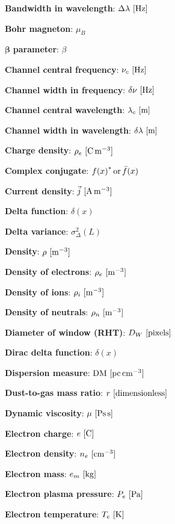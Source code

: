 \documentclass[a4paper,10pt]{article}
\begin{document}
{\noindent}\textbf{Bandwidth in wavelength}: $\Delta\lambda~[{\rm Hz}]$

{\noindent}\textbf{Bohr magneton}: $\mu_B$

{\noindent}$\boldsymbol{\beta}$ \textbf{parameter}: $\beta$

{\noindent}\textbf{Channel central frequency}: $\nu_c~[{\rm Hz}]$

{\noindent}\textbf{Channel width in frequency}: $\delta\nu~[{\rm Hz}]$

{\noindent}\textbf{Channel central wavelength}: $\lambda_c~[{\rm m}]$

{\noindent}\textbf{Channel width in wavelength}: $\delta\lambda~[{\rm m}]$

{\noindent}\textbf{Charge density}: $\rho_e~[{\rm C\,m^{-3}}]$

{\noindent}\textbf{Complex conjugate}: ${f(x)}^*\,{\rm or}\,\bar{f}(x)$

{\noindent}\textbf{Current density}: $\vec{j} ~ [{\rm A\,m^{-3}}]$

{\noindent}\textbf{Delta function}: $\delta (x)$

{\noindent}\textbf{Delta variance}: $\sigma_\Delta^2(L)$

{\noindent}\textbf{Density}: $\rho~[{\rm m^{-3}}]$

{\noindent}\textbf{Density of electrons}: $\rho_e~[{\rm m^{-3}}]$

{\noindent}\textbf{Density of ions}: $\rho_i~[{\rm m^{-3}}]$

{\noindent}\textbf{Density of neutrals}: $\rho_n~[{\rm m^{-3}}]$

{\noindent}\textbf{Diameter of window (RHT)}: $D_W ~ [{\rm pixels}]$

{\noindent}\textbf{Dirac delta function}: $\delta(x)$

{\noindent}\textbf{Dispersion measure}: ${\rm DM} ~ [{\rm pc\,cm^{-3}}]$

{\noindent}\textbf{Dust-to-gas mass ratio}: $r ~ [{\rm dimensionless}]$

{\noindent}\textbf{Dynamic viscosity}: $\mu ~ [{\rm Ps\,s}]$

{\noindent}\textbf{Electron charge}: $e~[{\rm C}]$

{\noindent}\textbf{Electron density}: $n_e~[{\rm cm^{-3}}]$

{\noindent}\textbf{Electron mass}: $e_m~[{\rm kg}]$

{\noindent}\textbf{Electron plasma pressure}: $P_e~[{\rm Pa}]$

{\noindent}\textbf{Electron temperature}: $T_e~[{\rm K}]$
\end{document}
